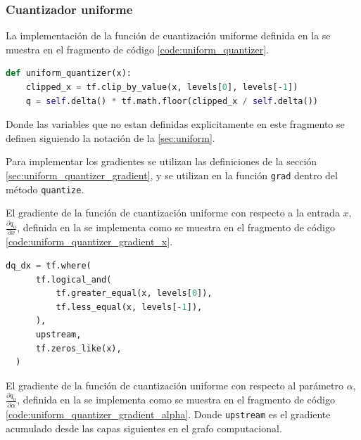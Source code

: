 \subsubsection{Cuantizador uniforme}

La implementación de la función de cuantización uniforme definida en la  se muestra en el fragmento de código \ref{code:uniform_quantizer}.

\begin{lstlisting}[language=Python,label=code:uniform_quantizer,caption=Definición de la función de cuantización uniforme.]
  def uniform_quantizer(x):
    clipped_x = tf.clip_by_value(x, levels[0], levels[-1])
    q = self.delta() * tf.math.floor(clipped_x / self.delta())
\end{lstlisting}

Donde las variables que no estan definidas explicitamente en este fragmento se definen siguiendo la notación de la \ref{sec:uniform}.


Para implementar los gradientes se utilizan las definiciones de la sección \ref{sec:uniform_quantizer_gradient}, y se utilizan en la función \texttt{grad} dentro del método \texttt{quantize}.

El gradiente de la función de cuantización uniforme con respecto a la entrada $x$, $\frac{\partial q_{u}}{\partial x}$, definida en la  se implementa como se muestra en el fragmento de código \ref{code:uniform_quantizer_gradient_x}.

\begin{lstlisting}[language=Python,label=code:uniform_quantizer_gradient_x,caption=Definición del gradiente de la función de cuantización uniforme con respecto a la entrada $x$.]
  dq_dx = tf.where(
      tf.logical_and(
          tf.greater_equal(x, levels[0]),
          tf.less_equal(x, levels[-1]),
      ),
      upstream,
      tf.zeros_like(x),
  )
\end{lstlisting}

El gradiente de la función de cuantización uniforme con respecto al parámetro $\alpha$, $\frac{\partial q_{u}}{\partial \alpha}$, definida en la  se implementa como se muestra en el fragmento de código \ref{code:uniform_quantizer_gradient_alpha}. Donde \texttt{upstream} es el gradiente acumulado desde las capas siguientes en el grafo computacional.

